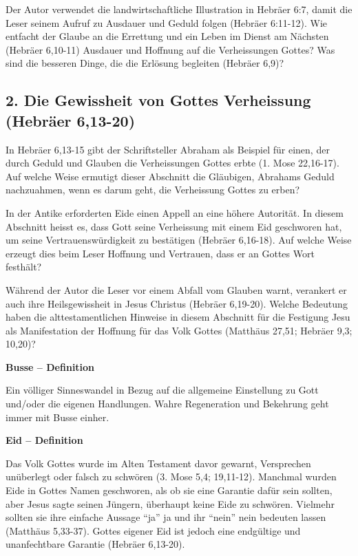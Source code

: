 \documentclass[
  12pt,
]{krantz}
\makeatletter
\newenvironment{kframe}{%
\medskip{}
\setlength{\fboxsep}{.8em}
 \def\at@end@of@kframe{}%
 \ifinner\ifhmode%
  \def\at@end@of@kframe{\end{minipage}}%
  \begin{minipage}{\columnwidth}%
 \fi\fi%
 \def\FrameCommand##1{\hskip\@totalleftmargin \hskip-\fboxsep
 \colorbox{shadecolor}{##1}\hskip-\fboxsep
     \hskip-\linewidth \hskip-\@totalleftmargin \hskip\columnwidth}%
 \MakeFramed {\advance\hsize-\width
   \@totalleftmargin\z@ \linewidth\hsize
   \@setminipage}}%
 {\par\unskip\endMakeFramed%
 \at@end@of@kframe}
\newenvironment{rmdblock}[1]
  {
  \begin{itemize}
  \renewcommand{\labelitemi}{
    \raisebox{-.7\height}[0pt][0pt]{
      {\setkeys{Gin}{width=3em,keepaspectratio}\texttt{[image: img/\#1]}}
    }
  }
  \setlength{\fboxsep}{1em}
  \begin{kframe}
  \item
  }
  {
  \end{kframe}
  \end{itemize}
  }
\newenvironment{rmddefinition}
  {\begin{rmdblock}{definition}}
  {\end{rmdblock}}
\makeatother
\begin{document}
Der Autor verwendet die landwirtschaftliche Illustration in Hebräer 6:7, damit die Leser seinem Aufruf zu Ausdauer und Geduld folgen (Hebräer 6:11-12). Wie entfacht der Glaube an die Errettung und ein Leben im Dienst am Nächsten (Hebräer 6,10-11) Ausdauer und Hoffnung auf die Verheissungen Gottes? Was sind die besseren Dinge, die die Erlösung begleiten (Hebräer 6,9)?

\hypertarget{die-gewissheit-von-gottes-verheissung-hebruxe4er-613-20}{%
\subsection{2. Die Gewissheit von Gottes Verheissung (Hebräer 6,13-20)}\label{die-gewissheit-von-gottes-verheissung-hebruxe4er-613-20}}

In Hebräer 6,13-15 gibt der Schriftsteller Abraham als Beispiel für einen, der durch Geduld und Glauben die Verheissungen Gottes erbte (1. Mose 22,16-17). Auf welche Weise ermutigt dieser Abschnitt die Gläubigen, Abrahams Geduld nachzuahmen, wenn es darum geht, die Verheissung Gottes zu erben?

In der Antike erforderten Eide einen Appell an eine höhere Autorität. In diesem Abschnitt heisst es, dass Gott seine Verheissung mit einem Eid geschworen hat, um seine Vertrauenswürdigkeit zu bestätigen (Hebräer 6,16-18). Auf welche Weise erzeugt dies beim Leser Hoffnung und Vertrauen, dass er an Gottes Wort festhält?

Während der Autor die Leser vor einem Abfall vom Glauben warnt, verankert er auch ihre Heilsgewissheit in Jesus Christus (Hebräer 6,19-20). Welche Bedeutung haben die alttestamentlichen Hinweise in diesem Abschnitt für die Festigung Jesu als Manifestation der Hoffnung für das Volk Gottes (Matthäus 27,51; Hebräer 9,3; 10,20)?

\begin{rmddefinition}
\textbf{Busse -- Definition}

Ein völliger Sinneswandel in Bezug auf die allgemeine Einstellung zu
Gott und/oder die eigenen Handlungen. Wahre Regeneration und Bekehrung
geht immer mit Busse einher.
\end{rmddefinition}

\begin{rmddefinition}
\textbf{Eid -- Definition}

Das Volk Gottes wurde im Alten Testament davor gewarnt, Versprechen
unüberlegt oder falsch zu schwören (3. Mose 5,4; 19,11-12). Manchmal
wurden Eide in Gottes Namen geschworen, als ob sie eine Garantie dafür
sein sollten, aber Jesus sagte seinen Jüngern, überhaupt keine Eide zu
schwören. Vielmehr sollten sie ihre einfache Aussage ``ja'' ja und ihr
``nein'' nein bedeuten lassen (Matthäus 5,33-37). Gottes eigener Eid ist
jedoch eine endgültige und unanfechtbare Garantie (Hebräer 6,13-20).
\end{rmddefinition}
\end{document}
